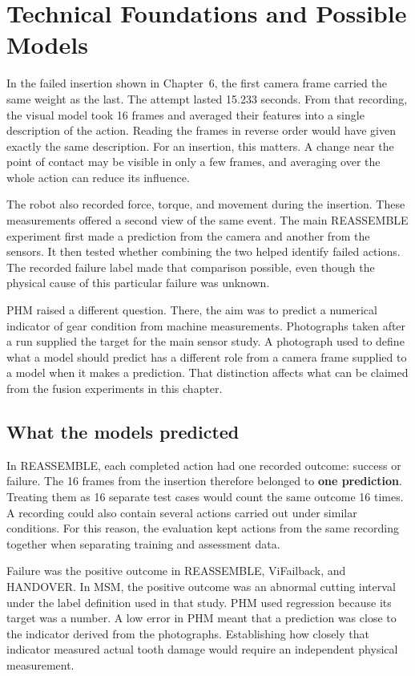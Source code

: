 \chapter{Technical Foundations and Possible Models}
\label{ch:foundations}

In the failed insertion shown in Chapter~6, the first camera frame carried the same
weight as the last. The attempt lasted 15.233 seconds. From that recording, the visual
model took 16 frames and averaged their features into a single description of the
action. Reading the frames in reverse order would have given exactly the same
description. For an insertion, this matters. A change near the point of contact may be
visible in only a few frames, and averaging over the whole action can reduce its
influence.

The robot also recorded force, torque, and movement during the insertion. These
measurements offered a second view of the same event. The main REASSEMBLE experiment
first made a prediction from the camera and another from the sensors. It then tested
whether combining the two helped identify failed actions. The recorded failure label
made that comparison possible, even though the physical cause of this particular failure
was unknown.

PHM raised a different question. There, the aim was to predict a numerical indicator of
gear condition from machine measurements. Photographs taken after a run supplied the
target for the main sensor study. A photograph used to define what a model should
predict has a different role from a camera frame supplied to a model when it makes a
prediction. That distinction affects what can be claimed from the fusion experiments in
this chapter.

\section{What the models predicted}

In REASSEMBLE, each completed action had one recorded outcome: success or failure. The
16 frames from the insertion therefore belonged to \textbf{one prediction}. Treating
them as 16 separate test cases would count the same outcome 16 times. A recording could
also contain several actions carried out under similar conditions. For this reason, the
evaluation kept actions from the same recording together when separating training and
assessment data.

Failure was the positive outcome in REASSEMBLE, ViFailback, and HANDOVER. In MSM, the
positive outcome was an abnormal cutting interval under the label definition used in
that study. PHM used regression because its target was a number. A low error in PHM
meant that a prediction was close to the indicator derived from the photographs.
Establishing how closely that indicator measured actual tooth damage would require an
independent physical measurement.

